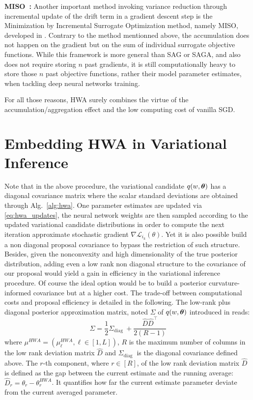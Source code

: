 \documentclass[tablecaption=bottom,wcp]{jmlr}
\begin{document}
\textbf{MISO~\citep{mairal2015incremental}:} Another important method invoking variance reduction through incremental update of the drift term in a gradient descent step is the Minimization by Incremental Surrogate Optimization method, namely MISO, developed in \citet{mairal2015incremental}.
Contrary to the method mentionned above, the accumulation does not happen on the gradient but on the sum of individual surrogate objective functions.
While this framework is more general than SAG or SAGA, and also does not require storing $n$ past gradients, it is still computationally heavy to store those $n$ past objective functions, rather their model parameter estimates, when tackling deep neural networks training.

For all those reasons, \textsc{HWA} surely combines the virtue of the accumulation/aggregation effect and the low computing cost of vanilla SGD.



\section{Embedding HWA in Variational Inference}\label{app:viandhwa}
Note that in the above procedure, the variational candidate $q(w, \param)$ has a diagonal covariance matrix where the scalar standard deviations are obtained through Alg.~\ref{alg:hwa}.
One parameter estimates are updated via \eqref{eq:hwa_updates}, the neural network weights are then sampled according to the updated variational candidate distributions in order to compute the next iteration approximate stochastic gradient $\nabla \mathcal{L}_{i_{k}}(\theta)$.
Yet it is also possible build a non diagonal proposal covariance to bypass the restriction of such structure.
Besides, given the nonconvexity and high dimensionality of the true posterior distribution, adding even a low rank non diagonal structure to the covariance of our proposal would yield a gain in efficiency in the variational inference procedure.
Of course the ideal option would be to build a posterior curvature-informed covariance but at a higher cost.
The trade-off between computational costs and proposal efficiency is detailed in the following.
The low-rank plus diagonal posterior approximation matrix, noted $\Sigma$ of $q(w, \param)$ introduced in \citep{maddox2019simple} reads:
\begin{equation}
\Sigma = \frac{1}{2} \Sigma_{\text {diag }}+\frac{\widehat{D} \widehat{D}^{\top}}{2(R-1)}
\end{equation}
where $\mu^{HWA} = (\mu_{\ell}^{HWA}, \ell \in [1,L])$, $R$ is the maximum number of columns in the low rank deviation matrix $\widehat{D}$ and $\Sigma_{\text {diag }}$ is the diagonal covariance defined above. The $r$-th component, where $r \in [R]$, of the  low rank deviation matrix $\widehat{D}$ is defined as the gap between the current estimate and the running average: $\widehat{D}_r = \theta_r - \theta^{HWA}_r$. It quantifies how far the current estimate parameter deviate from the current averaged parameter.
\end{document}
